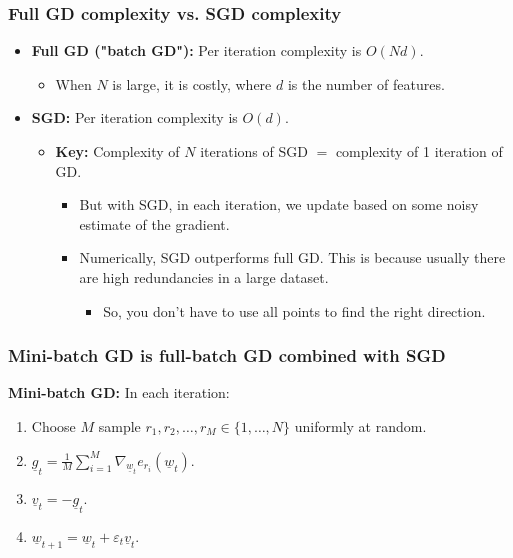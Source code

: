     \subsubsection{Full GD complexity vs. SGD complexity}
    \begin{intuition}
        \begin{itemize}
            \item \textbf{Full GD ("batch GD"):} Per iteration complexity is \( O(Nd) \).
            \begin{itemize}[left=0pt]
                \item When \( N \) is large, it is costly, where $d$ is the number of features.
            \end{itemize}
    
            \item \textbf{SGD:} Per iteration complexity is \( O(d) \).
            \begin{itemize}[left=0pt]
                \item \textbf{Key:} Complexity of \( N \) iterations of SGD \( = \) complexity of 1 iteration of GD.
                \begin{itemize}
                    \item But with SGD, in each iteration, we update based on some noisy estimate of the gradient.
                    \item Numerically, SGD outperforms full GD. This is because usually there are high redundancies in a large dataset.
                    \begin{itemize}
                        \item So, you don't have to use all points to find the right direction.
                    \end{itemize}
                \end{itemize} 
            \end{itemize}
        \end{itemize}
    \end{intuition}

    \subsubsection{Mini-batch GD is full-batch GD combined with SGD}
    \begin{definition}
        \textbf{Mini-batch GD:} In each iteration:
        \begin{enumerate}[left=0pt]
            \item Choose \( M \) sample \( r_1, r_2, \dots, r_M \in \{1, \dots, N\} \) uniformly at random.
            \item \( \underline{g}_t = \frac{1}{M} \sum_{i=1}^{M} \nabla_{\underline{w}_t} e_{r_i}(\underline{w}_t) \).
            \item \( \underline{v}_t = -\underline{g}_t \).
            \item \( \underline{w}_{t+1} = \underline{w}_t + \varepsilon_t \underline{v}_t \).
        \end{enumerate}
    \end{definition}

